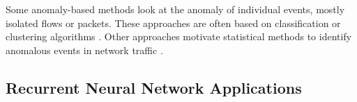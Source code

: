 \documentclass[a4paper,12pt,twoside]{article}
\begin{document}

Some anomaly-based methods look at the anomaly of individual events, mostly isolated flows or packets. These approaches are often based on classification or  clustering algorithms \cite{lin2015cann,javaid2016deep}. Other approaches motivate statistical methods to identify anomalous events in network traffic \cite{mahoney2002learning}. %



\subsection{Recurrent Neural Network Applications}

\end{document}
